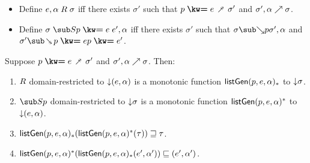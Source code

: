 \begin{lemma}
  \label{lem:aux:list-gen:gc}
  \item
  \begin{itemize}
    \item Define $e, \alpha \mathrel{R} \sigma $ iff there exists $\sigma'$ such that $\clauseUncurried{p}{e} \desugarClauseFwd \sigma'$ and ${\sigma'},{\alpha} \nearrow {\sigma}$.
    \item Define $\sigma \listGenBwd{\clauseUncurried{p}{e}} e', \alpha$ iff there exists $\sigma'$ such that $\totalisebwd{\sigma}{p}{\sigma'}{\alpha}$ and $\sigma' \desugarClauseBwd{\clauseUncurried{p}{e}} \clauseUncurried{p}{e'}$.
  \end{itemize}
  Suppose $\clauseUncurried{p}{e} \desugarClauseFwd \sigma'$ and ${\sigma'},{\alpha} \nearrow {\sigma}$. Then:
  \begin{enumerate}
     \item $\mathrel{R}$ domain-restricted to ${\downarrow}{(e, \alpha)}$ is a monotonic function $\mathsf{listGen}(p, e, \alpha)_*$ to ${\downarrow}{\sigma}$.
     \item $\listGenBwd{p}$ domain-restricted to ${\downarrow}{\sigma}$ is a monotonic function $\mathsf{listGen}(p, e, \alpha)^*$ to ${\downarrow}{(e, \alpha)}$.
     \item $\mathsf{listGen}(p, e, \alpha)_*(\mathsf{listGen}(p, e, \alpha)^*(\tau)) \sqsupseteq \tau$.
     \item $\mathsf{listGen}(p, e, \alpha)^*(\mathsf{listGen}(p, e, \alpha)_*(e', \alpha')) \sqsubseteq (e', \alpha')$.
  \end{enumerate}
\end{lemma}
